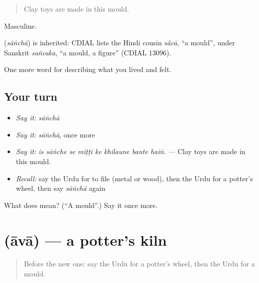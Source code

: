 \begin{quote}
Clay toys are made in this mould.
\end{quote}

Masculine.

\begin{cousinweb}
\textbf{} (\emph{sāṅchā}) is inherited: CDIAL lists the Hindi cousin \emph{sā̃cā}, \textquotedblleft{}a mould\textquotedblright{}, under Sanskrit \emph{sañcaka}, \textquotedblleft{}a mould, a figure\textquotedblright{} (CDIAL 13096).
\end{cousinweb}

\begin{grammarlens}[title={What you've built}]
One more word for describing what you lived and felt.
\end{grammarlens}

\subsection*{Your turn}
\begin{itemize}
\raggedright
  \item \emph{Say it:} \emph{sāṅchā}
  \item \emph{Say it:} \emph{sāṅchā}, once more
  \item \emph{Say it:} \emph{is sāṅche se miṭṭī ke khilaune bante haiṅ.} — Clay toys are made in this mould.
  \item \emph{Recall:} say the Urdu for to file (metal or wood), then the Urdu for a potter's wheel, then say \emph{sāṅchā} again
\end{itemize}

\begin{tcolorbox}[breakable,colback=teal!4,colframe=teal!35!black,title={Before you move on}]
What does  mean? (\textquotedblleft{}A mould\textquotedblright{}.) Say it once more.
\end{tcolorbox}
\section[\texorpdfstring{\ur{آوا} (āvā)}{آوا (āvā)}]{ (āvā) — a potter's kiln}

\label{lesson:UR-C498-ava}



\begin{quote}
Before the new one: say the Urdu for a potter's wheel, then the Urdu for a mould.
\end{quote}

